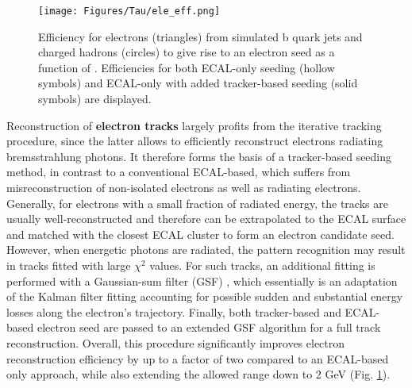 

\begin{figure}[ht!]
    \centering
    \texttt{[image: Figures/Tau/ele\_eff.png]}
    \caption{Efficiency for electrons (triangles) from simulated b quark jets and charged hadrons (circles) to give rise to an electron seed as a function of \pt. Efficiencies for both ECAL-only seeding (hollow symbols) and ECAL-only with added tracker-based seeding (solid symbols) are displayed.}
    \label{fig:ele_eff}
\end{figure}

Reconstruction of \textbf{electron tracks} largely profits from the iterative tracking procedure, since the latter allows to efficiently reconstruct electrons radiating bremsstrahlung photons. It therefore forms the basis of a tracker-based seeding method, in contrast to a conventional ECAL-based, which suffers from misreconstruction of non-isolated electrons as well as radiating electrons. Generally, for electrons with a small fraction of radiated energy, the tracks are usually well-reconstructed and therefore can be extrapolated to the ECAL surface and matched with the closest ECAL cluster to form an electron candidate seed. However, when energetic photons are radiated, the pattern recognition may result in tracks fitted with large $\chi^2$ values. For such tracks, an additional fitting is performed with a Gaussian-sum filter (GSF) \cite{adam2005reconstruction}, which essentially is an adaptation of the Kalman filter fitting accounting for possible sudden and substantial energy losses along the electron's trajectory. Finally, both tracker-based and ECAL-based electron seed are passed to an extended GSF algorithm for a full track reconstruction. Overall, this procedure significantly improves electron reconstruction efficiency by up to a factor of two compared to an ECAL-based only approach, while also extending the allowed \pt range down to 2 GeV (Fig. \ref{fig:ele_eff}).

